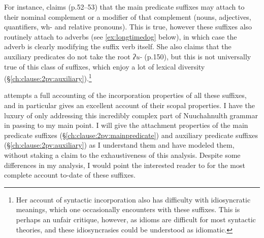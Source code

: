 For instance, \citeauthor{wojdak2005} claims (p.52--53) that the main predicate suffixes may attach to their nominal complement or a modifier of that complement (nouns, adjectives, quantifiers, wh- and relative pronouns). This is true, however these suffixes also routinely attach to adverbs (see \ref{ex:longtimedog} below), in which case the adverb is clearly modifying the suffix verb itself. %
She also claims that the auxiliary predicates do not take the root \textit{ʔu-} (p.150), but this is not universally true of this class of suffixes, which enjoy a lot of lexical diversity (\S\ref{ch:clause:2pv:auxiliary}).\footnote{Her account of syntactic incorporation also has difficulty with idiosyncratic meanings, which one occasionally encounters with these suffixes. This is perhaps an unfair critique, however, as idioms are difficult for most syntactic theories, and these idiosyncrasies could be understood as idiomatic.}

\citeauthor{wojdak2005} attempts a full accounting of the incorporation properties of all these suffixes, and in particular gives an excellent account of their scopal properties. I have the luxury of only addressing this incredibly complex part of Nuuchahnulth grammar in passing to my main point. I will give the attachment properties of the main predicate suffixes (\S\ref{ch:clause:2pv:mainpredicate}) and auxiliary predicate suffixes (\S\ref{ch:clause:2pv:auxiliary}) as I understand them and have modeled them, without staking a claim to the exhaustiveness of this analysis. Despite some differences in my analysis, I would point the interested reader to \citet{wojdak2005} for the most complete account to-date of these suffixes.


